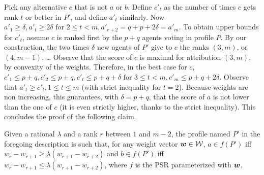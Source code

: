 Pick any alternative $c$ that is not $a$ or $b$. 
Define $c'_t$ as the number of times $c$ gets rank $t$ or better in $P'$, and define $a'_t$ similarly. Now $a'_1 ≥ \delta, a'_t ≥ 2\delta \text{ for } 2 ≤ t < m, a'_{r+2} = q+p+2\delta = a'_m$. To obtain upper bounds for $c'_t$, assume $c$ is ranked first by the $p+q$ agents voting in profile $P$. By our construction, the two times $\delta$ new agents of $P'$ give to $c$ the ranks $(3, m)$, or $(4, m-1)$, … Observe that the score of $c$ is maximal for attribution $(3, m)$, by convexity of the weights. Therefore, in the best case for $c$, $c'_1 ≤ p + q, c'_2 ≤ p+q, c'_t ≤ p+q+\delta \text{ for } 3 ≤ t < m, c'_m ≤ p+q+2\delta$. Observe that $a'_t ≥ c'_t, 1 ≤ t ≤ m$ (with strict inequality for $t=2$). Because weights are non increasing, this guarantees, with $\delta = p + q$, that the score of $a$ is not lower than the one of $c$ (it is even strictly higher, thanks to the strict inequality). This concludes the proof of the following claim.

\begin{claim}
	Given a rational $\lambda$ and a rank $r$ between $1$ and $m - 2$, the profile named $P'$ in the foregoing description is such that, for any weight vector $\bm{w} \in \mathcal{W}$, $a \in f(P')$ iff $w_{r} - w_{r+1} ≥ \lambda (w_{r+1} - w_{r+2})$ and $b \in f(P')$ iff $w_{r} - w_{r+1} ≤ \lambda (w_{r+1} - w_{r+2})$, where $f$ is the PSR parameterized with $\bm{w}$.
\end{claim}


